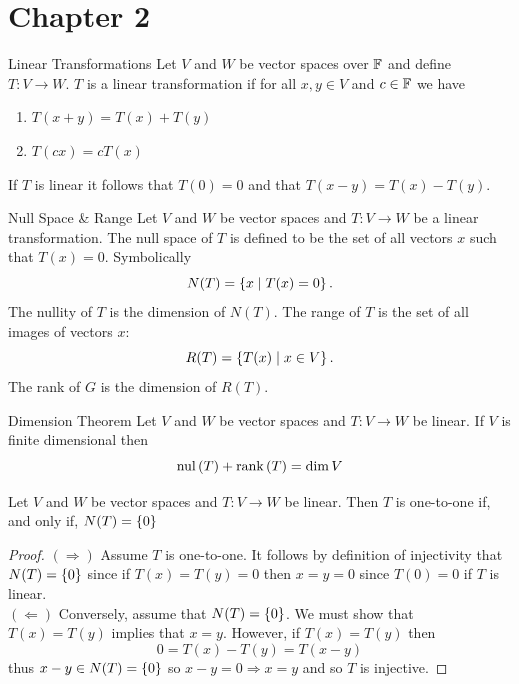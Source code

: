 \documentclass{exam}
\begin{document}
\section*{Chapter 2}
    \begin{defbox}{Linear Transformations}
        Let $V$ and $W$ be vector spaces over $\mathbb F$ and define $T: V \to W$. $T$ is a linear transformation if for all $x, y \in V$ and $c \in \mathbb F$ we have
        \begin{enumerate}
            \item $T(x + y) = T(x) + T(y)$
            \item $T(cx) = cT(x)$
        \end{enumerate}
    \end{defbox}

    If $T$ is linear it follows that $T(0) = 0$ and that $T(x - y) = T(x) - T(y)$.

    \begin{defbox}{Null Space \& Range}
        Let $V$ and $W$ be vector spaces and $T: V \to W$ be a linear transformation. The null space of $T$ is defined to be the set of all vectors $x$ such that $T(x) = 0$. Symbolically
        \[
            N(T) = \left\{x \mid T(x) = 0 \right\}.
        \]
        The nullity of $T$ is the dimension of $N(T)$.
        The range of $T$ is the set of all images of vectors $x$:
        \[
            R(T) = \left\{T(x) \mid x \in V \right\}.
        \]
        The rank of $G$ is the dimension of $R(T)$.
    \end{defbox}

    \begin{thm}{Dimension Theorem}{}
        Let $V$ and $W$ be vector spaces and $T: V \to W$ be linear. If $V$ is finite dimensional then 
        \[
            \text{nul}\left(T\right) + \text{rank}\left(T\right) = \dim{V} 
        \]
    \end{thm}

    \begin{thm}{}{}
        Let $V$ and $W$ be vector spaces and $T: V \to W$ be linear. Then $T$ is one-to-one if, and only if, $N(T) = \left\{0 \right\}$
        \begin{proof}
            $(\Rightarrow)$ Assume $T$ is one-to-one. It follows by definition of injectivity that $N(T) = \left\{0 \right\}$ since if $T(x) = T(y) = 0$ then $x = y = 0$ since $T(0) = 0$ if $T$ is linear. \\
            $(\Leftarrow)$ Conversely, assume that $N(T) = \left\{0 \right\}$. We must show that $T(x) = T(y)$ implies that $x = y$. However, if $T(x) = T(y)$ then 
            \[
                0 = T(x) - T(y) = T(x - y) 
            \]
            thus $x - y \in N(T) = \left\{0 \right\}$ so $x - y = 0 \Rightarrow x = y$ and so $T$ is injective.
        \end{proof}
    \end{thm}
\end{document}
